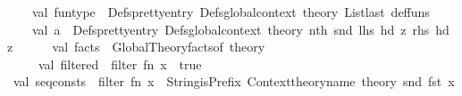 \begin{isabellebody}
\isanewline
\ \ \ \ val\ fun{\isacharunderscore}{\kern0pt}type\ {\isacharequal}{\kern0pt}\ Defs{\isachardot}{\kern0pt}pretty{\isacharunderscore}{\kern0pt}entry\ {\isacharparenleft}{\kern0pt}Defs{\isachardot}{\kern0pt}global{\isacharunderscore}{\kern0pt}context\ {\isacharat}{\kern0pt}{\isacharbraceleft}{\kern0pt}theory{\isacharbraceright}{\kern0pt}{\isacharparenright}{\kern0pt}\ {\isacharparenleft}{\kern0pt}List{\isachardot}{\kern0pt}last\ def{\isacharunderscore}{\kern0pt}funs{\isacharparenright}{\kern0pt}\isanewline
\isanewline
\ \ \ {\isacharparenleft}{\kern0pt}{\isacharasterisk}{\kern0pt}\ val\ a\ {\isacharequal}{\kern0pt}\ Defs{\isachardot}{\kern0pt}pretty{\isacharunderscore}{\kern0pt}entry\ {\isacharparenleft}{\kern0pt}Defs{\isachardot}{\kern0pt}global{\isacharunderscore}{\kern0pt}context\ {\isacharat}{\kern0pt}{\isacharbraceleft}{\kern0pt}theory{\isacharbraceright}{\kern0pt}{\isacharparenright}{\kern0pt}\ {\isacharparenleft}{\kern0pt}nth\ {\isacharparenleft}{\kern0pt}snd\ {\isacharparenleft}{\kern0pt}{\isacharhash}{\kern0pt}lhs\ {\isacharparenleft}{\kern0pt}hd\ z{\isacharparenright}{\kern0pt}{\isacharcomma}{\kern0pt}\ {\isacharhash}{\kern0pt}rhs\ {\isacharparenleft}{\kern0pt}hd\ z{\isacharparenright}{\kern0pt}{\isacharparenright}{\kern0pt}\ {\isacharparenright}{\kern0pt}{}{\isacharparenright}{\kern0pt}\ {\isacharasterisk}{\kern0pt}{\isacharparenright}{\kern0pt}\isanewline
\ {\isacartoucheclose}\isanewline
\isanewline
{}\isamarkupfalse%
\ {\isacartoucheopen}\ val\ facts\ {\isacharequal}{\kern0pt}\ Global{\isacharunderscore}{\kern0pt}Theory{\isachardot}{\kern0pt}facts{\isacharunderscore}{\kern0pt}of\ {\isacharat}{\kern0pt}{\isacharbraceleft}{\kern0pt}theory{\isacharbraceright}{\kern0pt}\ \isanewline
\ \ \ \ \ val\ filtered\ {\isacharequal}{\kern0pt}\ filter\ {\isacharparenleft}{\kern0pt}fn\ x\ {\isacharequal}{\kern0pt}{\isachargreater}{\kern0pt}\ true{\isacharparenright}{\kern0pt}\ {\isacharbrackleft}{\kern0pt}{\isacharbrackright}{\kern0pt}{\isacartoucheclose}\isanewline
\isanewline
{}\isamarkupfalse%
\ {\isacartoucheopen}val\ seq{\isacharunderscore}{\kern0pt}consts\ {\isacharequal}{\kern0pt}\ filter\ {\isacharparenleft}{\kern0pt}fn\ x\ {\isacharequal}{\kern0pt}{\isachargreater}{\kern0pt}\ {\isacharparenleft}{\kern0pt}String{\isachardot}{\kern0pt}isPrefix\ {\isacharparenleft}{\kern0pt}Context{\isachardot}{\kern0pt}theory{\isacharunderscore}{\kern0pt}name\ {\isacharat}{\kern0pt}{\isacharbraceleft}{\kern0pt}theory{\isacharbraceright}{\kern0pt}{\isacharparenright}{\kern0pt}\ {\isacharparenleft}{\kern0pt}snd\ {\isacharparenleft}{\kern0pt}fst\ {\isacharparenleft}{\kern0pt}x{\isacharparenright}{\kern0pt}{\isacharparenright}{\kern0pt}{\isacharparenright}{\kern0pt}{\isacharparenright}{\kern0pt}{\isacharparenright}{\kern0pt}\ \isanewline

\end{isabellebody}
